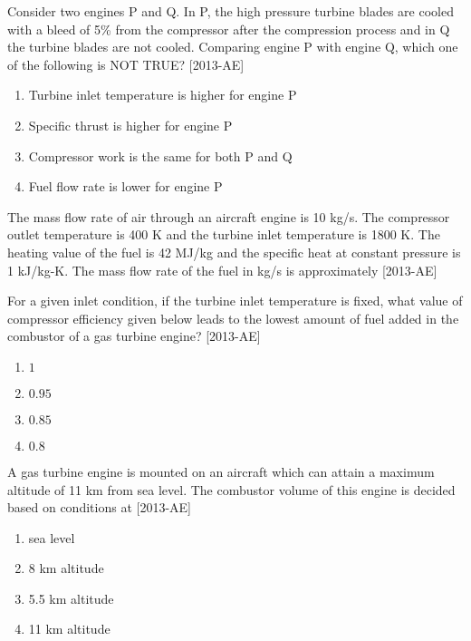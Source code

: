     \item Consider two engines P and Q. In P, the high pressure turbine blades are cooled with a bleed of 5\% from the compressor after the compression process and in Q the turbine blades are not cooled. Comparing engine P with engine Q, which one of the following is NOT TRUE?  \hfill{[2013-AE]}
    \begin{enumerate}
        \item Turbine inlet temperature is higher for engine P 
        \item Specific thrust is higher for engine P 
        \item Compressor work is the same for both P and Q
        \item Fuel flow rate is lower for engine P 
    \end{enumerate}

    \item The mass flow rate of air through an aircraft engine is 10 kg/s. The compressor outlet temperature is 400 K and the turbine inlet temperature is 1800 K. The heating value of the fuel is 42 MJ/kg and the specific heat at constant pressure is 1 kJ/kg-K. The mass flow rate of the fuel in kg/s is approximately \underline{\hspace{2cm}} \hfill{[2013-AE]}

    \item For a given inlet condition, if the turbine inlet temperature is fixed, what value of compressor efficiency given below leads to the lowest amount of fuel added in the combustor of a gas turbine engine? \hfill{[2013-AE]}
    \begin{enumerate}
        \item $1$
        \item $0.95$
        \item $0.85$
        \item $0.8$
    \end{enumerate}

    \item A gas turbine engine is mounted on an aircraft which can attain a maximum altitude of 11 km from sea level. The combustor volume of this engine is decided based on conditions at  \hfill{[2013-AE]}
    \begin{enumerate}
        \item sea level
        \item 8 km altitude
        \item 5.5 km altitude
        \item 11 km altitude
    \end{enumerate}

